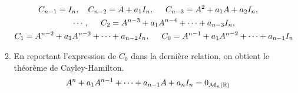\begin{enumerate}
\begin{enumerate}
\begin{multline*}
  C_{n-1} = I_n,\quad C_{n-2}= A+a_1I_n,\hspace{0.5cm} C_{n-3}=  A^2+a_1A+a_2I_n,\hspace{0.5cm} \\
\cdots , \hspace{0.5cm} C_{2} = A^{n-3}+a_1A^{n-4}+\cdots +a_{n-3}I_n,\\
 C_{1}=  A^{n-2}+a_1A^{n-3}+\cdots +a_{n-2}I_n,\hspace{0.5cm} C_{0} = A^{n-1}+a_1A^{n-2}+\cdots +a_{n-1}I_n
\end{multline*}
\item En reportant l'expression de $C_0$ dans la derni{\`e}re relation, on obtient le th{\'e}or{\`e}me de Cayley-Hamilton.
\[A^n+a_1A^{n-1}+\cdots+a_{n-1}A+a_nI_n=0_{\mathcal{M}_n(\mathbb{R})}\]
  \end{enumerate}
\end{enumerate}

